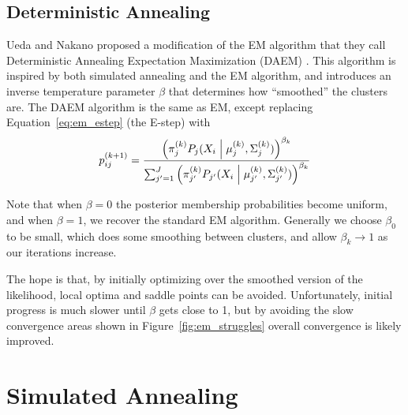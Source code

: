 \documentclass{article}
\newcommand*{\cond}{\;\ifnum\currentgrouptype=16 \middle\fi|\;}
\theoremstyle{definition}
\theoremstyle{algodesc}
\begin{document}
\subsection{Deterministic Annealing}

Ueda and Nakano proposed a modification of the EM algorithm that they call Deterministic Annealing Expectation Maximization (DAEM) \cite{uedanakano98}. This algorithm is inspired by both simulated annealing and the EM algorithm, and introduces an inverse temperature parameter $\beta$ that determines how ``smoothed'' the clusters are. The DAEM algorithm is the same as EM, except replacing Equation~\ref{eq:em_estep} (the E-step) with
  \begin{equation} \label{eq:da_estep}
  p_{ij}^{(k+1)}
    = \frac{\left( \pi_j^{(k)} P_j(X_i \cond \mu_j^{(k)}, \Sigma_j^{(k)}) \right)^{\beta_k}}{\sum_{j'=1}^J \left( \pi_{j'}^{(k)} P_{j'}(X_i \cond \mu_{j'}^{(k)}, \Sigma_{j'}^{(k)}) \right)^{\beta_k}}
  \end{equation}

Note that when $\beta = 0$ the posterior membership probabilities become uniform, and when $\beta = 1$, we recover the standard EM algorithm. Generally we choose $\beta_0$ to be small, which does some smoothing between clusters, and allow $\beta_k \to 1$ as our iterations increase.

The hope is that, by initially optimizing over the smoothed version of the likelihood, local optima and saddle points can be avoided. Unfortunately, initial progress is much slower until $\beta$ gets close to 1, but by avoiding the slow convergence areas shown in Figure~\ref{fig:em_struggles} overall convergence is likely improved.


\section{Simulated Annealing} \label{sec:simanneal}
\end{document}

